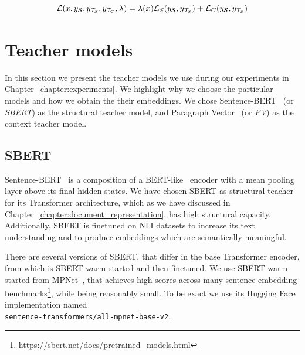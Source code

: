 \begin{equation}\label{eq:abstract_loss}
  \mathcal{L}(
    x,
    y_{\mathcal{S}},
    y_{\mathcal{T}_S},
    y_{\mathcal{T}_C},
    \lambda
  ) =
    \lambda(x) \mathcal{L}_S(y_{\mathcal{S}}, y_{\mathcal{T}_S}) +
            \mathcal{L}_C(y_{\mathcal{S}}, y_{\mathcal{T}_S})
\end{equation}

\section{Teacher models}\label{section:teacher_models}


In this section we present the teacher models we use during our experiments in
Chapter~\ref{chapter:experiments}. We highlight why we choose the particular
models and how we obtain the their embeddings. We chose
Sentence-BERT~\citep{reimers2020making} (or \emph{SBERT}) as the structural
teacher model, and Paragraph Vector~\citep{le2014distributed} (or \emph{PV}) as
the context teacher model.

\subsection{SBERT}

Sentence-BERT~\citep{reimers2019sentence} is a composition of a
BERT-like~\citep{devlin2019bert} encoder with a mean pooling layer above its
final hidden states. We have chosen SBERT as structural teacher for its
Transformer architecture, which as we have discussed in
Chapter~\ref{chapter:document_representation}, has high structural capacity.
Additionally, SBERT is finetuned on NLI datasets to increase its text
understanding and to produce embeddings which are semantically meaningful.

There are several versions of SBERT, that differ in the base Transformer
encoder, from which is SBERT warm-started and then finetuned. We use SBERT
warm-started from MPNet~\citep{song2020mpnet}, that achieves high scores across
many sentence embedding
benchmarks\footnote{\url{https://sbert.net/docs/pretrained_models.html}}, while
being reasonably small. To be exact we use its Hugging Face implementation
named \\ \texttt{sentence-transformers/all-mpnet-base-v2}.

